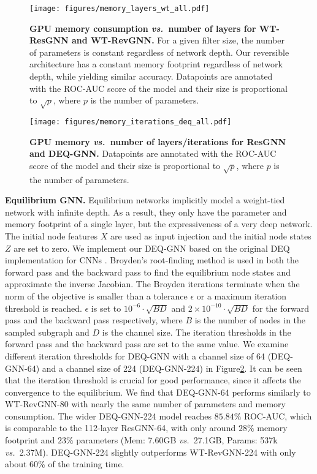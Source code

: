 \documentclass{article}
\newcommand{\vs}{\emph{vs.~}}
\newcommand{\figLabel}{Figure\xspace}
\newcommand{\mysection}[1]{\vspace{0pt}\noindent\textbf{#1.}}
\begin{document}
\begin{figure}[h]
    \centering
    \texttt{[image: figures/memory\_layers\_wt\_all.pdf]}
    \caption{\textbf{GPU memory consumption \vs number of layers for WT-ResGNN and WT-RevGNN.} For a given filter size, the number of parameters is constant regardless of network depth. Our reversible architecture has a constant memory footprint regardless of network depth, while yielding similar accuracy. Datapoints are annotated with the ROC-AUC score of the model and their size is proportional to $\sqrt{p}$, where $p$ is the number of parameters.}
    \label{fig:memory_layers_wt}
    \vspace{4pt}
\end{figure}

\begin{figure}[h]
    \centering
    \texttt{[image: figures/memory\_iterations\_deq\_all.pdf]}
    \caption{\textbf{GPU memory \vs number of layers/iterations for ResGNN and DEQ-GNN.} Datapoints are annotated with the ROC-AUC score of the model and their size is proportional to $\sqrt{p}$, where $p$ is the number of parameters.}
    \label{fig:memory_iterations_deq}
    \vspace{4pt}
\end{figure}

\mysection{Equilibrium GNN}
Equilibrium networks implicitly model a weight-tied network with infinite depth. As a result, they only have the parameter and memory footprint of a single layer, but the expressiveness of a very deep network. The initial node features $X$ are used as input injection and the initial node states $Z$ are set to zero. We implement our DEQ-GNN based on the original DEQ implementation for CNNs \citep{bai2019deep}. Broyden’s root-finding method is used \citep{broyden1965class} in both the forward pass and the backward pass to find the equilibrium node states and approximate the inverse Jacobian. The Broyden iterations terminate when the norm of the objective is smaller than a tolerance $\epsilon$ or a maximum iteration threshold is reached. $\epsilon$ is set to $10^{-6} \cdot \sqrt{BD}$ and $2 \times 10^{-10} \cdot \sqrt{BD}$ for the forward pass and the backward pass respectively, where $B$ is the number of nodes in the sampled subgraph and $D$ is the channel size. The iteration thresholds in the forward pass and the backward pass are set to the same value. We examine different iteration thresholds for DEQ-GNN with a channel size of 64 (DEQ-GNN-64) and a channel size of 224 (DEQ-GNN-224) in \figLabel \ref{fig:memory_iterations_deq}. It can be seen that the iteration threshold is crucial for good performance, since it affects the convergence to the equilibrium. We find that DEQ-GNN-64 performs similarly to WT-RevGNN-80 with nearly the same number of parameters and memory consumption.
The wider DEQ-GNN-224 model reaches $85.84\%$ ROC-AUC, which is comparable to the 112-layer ResGNN-64, with only around $28\%$ memory footprint and $23\%$ parameters (Mem: 7.60GB \vs 27.1GB, Params: 537k \vs 2.37M). DEQ-GNN-224 slightly outperforms WT-RevGNN-224 with only about 60\% of the training time.
\end{document}
